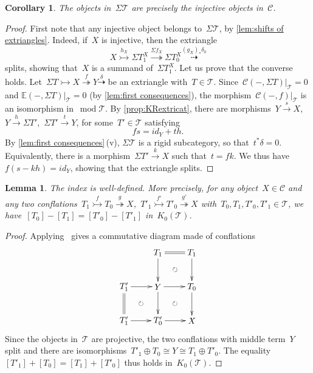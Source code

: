 \documentclass{amsart}
\newtheorem{corollary}[theorem]{Corollary}
\newtheorem{lemma}[theorem]{Lemma}
\theoremstyle{definition}
\newcommand{\cat}{\mathcal{C}}
\newcommand{\susp}{\Sigma}
\newcommand{\MOD}{\operatorname{mod}}
\newcommand{\tc}{\mathcal{T}}
\newcommand{\infl}{\rightarrowtail}
\newcommand{\defl}{\twoheadrightarrow}
\newcommand{\modt}{\MOD\tc}
\newcommand{\kzero}[1]{K_0(#1)}
\begin{document}
\begin{corollary}
\label{coro:Sigma T injectives}
The objects in~$\susp\tc$ are precisely the injective objects in~$\cat$.
\end{corollary}

\begin{proof}
First note that any injective object belongs to~$\susp \tc$, by \cref{lem:shifts of extriangles}.
Indeed, if~$X$ is injective, then the extriangle
\[
X \overset{h_X}{\infl} \susp T_1^X \overset{\susp f_X}{\defl} \susp T_0^X \overset{(g_X)_\ast\delta_0}{\dashrightarrow}
\]
splits, showing that~$X$ is a summand of~$\susp T_1^X$.
Let us prove that the converse holds.
Let~$\susp T \infl X \overset{f}{\defl} Y\overset{\delta}{\dashrightarrow}$ be an extriangle with~$T\in\tc$.
Since~$\cat(-,\susp T)|_\tc = 0$ and
$\mathbb{E}(-,\susp T)|_\tc =0$ (by \cref{lem:first consequences}),
the morphism~$\cat(-,f)|_\tc$ is an isomorphism in~$\modt$.
By \cref{prop:KRextricat}, there are morphisms~$Y\overset{s}{\to} X$,~$Y\xrightarrow{h}\susp T'$,~$\susp T'\xrightarrow{t} Y$, for some~$T'\in\tc$ satisfying
\[
fs = id_Y + th.
\]
By \cref{lem:first consequences}\,(v), $\susp\tc$ is a rigid subcategory, so that~$t^\ast\delta=0$.
Equivalently, there is a morphism~$\susp T'\xrightarrow{k} X$ such that~$t=fk$.
We thus have~$f(s-kh)=id_Y$, showing that the extriangle splits.
\end{proof}

\begin{lemma}
\label{lem:index well-defined extricat}
 The index is well-defined. More precisely, for any object~$X\in\cat$ and any two conflations~$T_1\overset{f}{\infl} T_0 \overset{g}{\defl} X$,~$T'_1\overset{f'}{\infl} T'_0 \overset{g'}{\defl} X$ with~$T_0,T_1,T'_0,T'_1\in\tc$, we have~$[T_0]-[T_1]=[T'_0]-[T'_1]$ in~$\kzero{\tc}$.
\end{lemma}

\begin{proof}
Applying~\cite[Prop.~3.15]{NakaokaPalu} gives a commutative diagram made of conflations
\[
\xy
%
(-7,21)*+{T_1}="-12";
(7,21)*+{T_1}="-14";
%
(-21,7)*+{T'_1}="0";
(-7,7)*+{Y}="2";
(7,7)*+{T_0}="4";
%
(-21,-7)*+{T'_1}="10";
(-7,-7)*+{T'_0}="12";
(7,-7)*+{X}="14";
%
{\ar@{=} "-12";"-14"};
%
{\ar "-12";"2"};
{\ar "-14";"4"};
%
{\ar "0";"2"};
{\ar "2";"4"};
%
{\ar@{=} "0";"10"};
{\ar "2";"12"};
{\ar "4";"14"};
%
{\ar "10";"12"};
{\ar "12";"14"};
%
{\ar@{}|\circlearrowright "-12";"4"};
{\ar@{}|\circlearrowright "0";"12"};
{\ar@{}|\circlearrowright "2";"14"};
\endxy
\]
Since the objects in~$\tc$ are projective, the two conflations with middle term~$Y$ split and there are isomorphisms~$T'_1\oplus T_0 \cong Y \cong T_1\oplus T'_0$.
The equality~$[T'_1]+[T_0]=[T_1]+[T'_0]$ thus holds in~$\kzero{\tc}$.
\end{proof}
\end{document}
